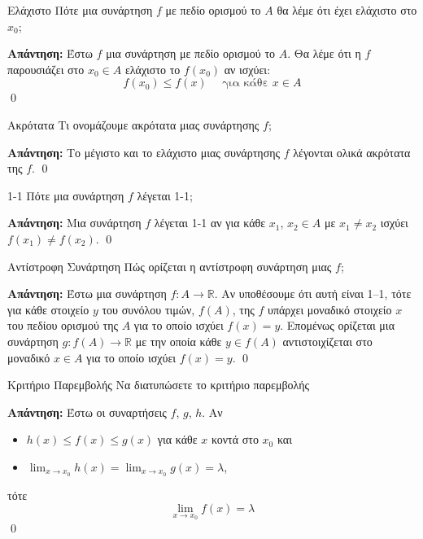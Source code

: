 \documentclass[a4paper, 12pt]{article}
\renewenvironment{proof}[1][\textbf{Απάντηση}]{%
  \par\noindent\textbf{#1:} \rmfamily}{\qed\par}
\begin{document}
\begin{theorem}{Ελάχιστο}
  Πότε μια συνάρτηση $f$ με πεδίο ορισμού το $A$ θα λέμε ότι έχει ελάχιστο στο $x_0$;
\end{theorem}
\begin{proof}
  Έστω $f$ μια συνάρτηση με πεδίο ορισμού το $A$. Θα λέμε ότι η $f$ παρουσιάζει στο $x_0\in Α$ ελάχιστο το $f(x_0)$ αν ισχύει:
  $$f(x_0) \leq f(x) \quad \text{ για κάθε } x \in A$$
\end{proof}

\begin{theorem}{Ακρότατα}
  Τι ονομάζουμε ακρότατα μιας συνάρτησης $f$;
\end{theorem}
\begin{proof}
  Το μέγιστο και το ελάχιστο μιας συνάρτησης $f$ λέγονται ολικά ακρότατα της $f$.
\end{proof}

\begin{theorem}{1-1}
  Πότε μια συνάρτηση $f$ λέγεται 1-1;
\end{theorem}
\begin{proof}
  Μια συνάρτηση $f$ λέγεται 1-1 αν για κάθε $x_1$, $x_2 \in A$ με $x_1 \neq x_2$ ισχύει $f(x_1) \neq f(x_2)$.
\end{proof}

\begin{theorem}{Αντίστροφη Συνάρτηση}
  Πώς ορίζεται η αντίστροφη συνάρτηση μιας $f$;
\end{theorem}
\begin{proof}
  Έστω μια συνάρτηση $f : A \to \mathbb{R}$. Αν υποθέσουμε ότι αυτή είναι 1–1, τότε για κάθε στοιχείο $y$ του συνόλου τιμών, $f(A)$, της $f$ υπάρχει μοναδικό στοιχείο $x$ του πεδίου ορισμού της $Α$ για το οποίο ισχύει $f(x) = y$. Επομένως ορίζεται μια συνάρτηση
  $g : f ( A) \to \mathbb{R}$ με την οποία κάθε $y \in f ( A)$ αντιστοιχίζεται στο μοναδικό $x \in A$ για το οποίο ισχύει $f(x) = y$.
\end{proof}

\begin{theorem}{Κριτήριο Παρεμβολής}
  Να διατυπώσετε το κριτήριο παρεμβολής
\end{theorem}
\begin{proof}
  Έστω οι συναρτήσεις $f$, $g$, $h$. Αν
  \begin{itemize}
    \item $h(x) \leq f(x) \leq g(x)$ για κάθε $x$ κοντά στο $x_0$ και
    \item $\lim_{x \to x_0} h(x) = \lim_{x \to x_0} g(x) = λ$,
  \end{itemize}
  τότε
  $$\lim_{x \to x_0} f(x) = λ$$
\end{proof}
\end{document}
